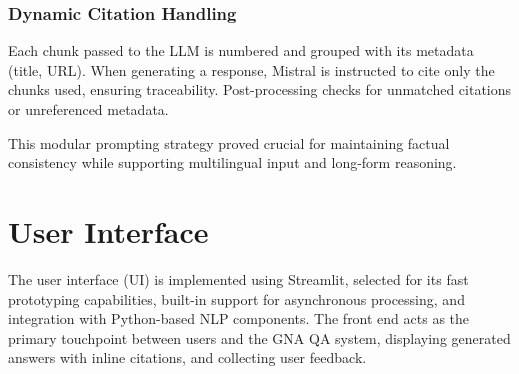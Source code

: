 \begin{spacing}{1.5}
\subsubsection*{Dynamic Citation Handling}

Each chunk passed to the LLM is numbered and grouped with its metadata (title, URL). When generating a response, Mistral is instructed to cite only the chunks used, ensuring traceability. Post-processing checks for unmatched citations or unreferenced metadata.

This modular prompting strategy proved crucial for maintaining factual consistency while supporting multilingual input and long-form reasoning.

\section{User Interface}
The user interface (UI) is implemented using Streamlit, selected for its fast prototyping capabilities, built-in support for asynchronous processing, and integration with Python-based NLP components. The front end acts as the primary touchpoint between users and the GNA QA system, displaying generated answers with inline citations, and collecting user feedback.


\end{spacing}
